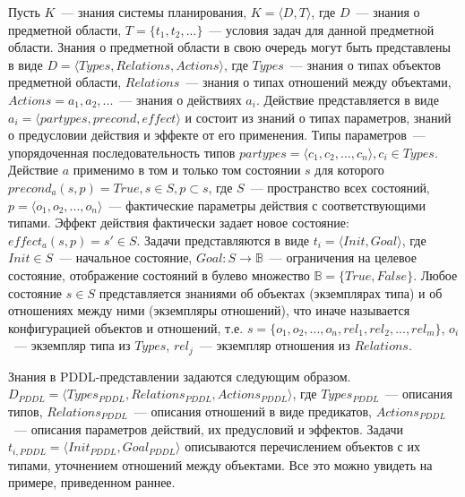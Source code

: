 \documentclass[a4paper,14pt]{extreport}
\begin{document}
   \par  Пусть $K$~--- знания системы планирования, $K = \langle D, T \rangle$, где $D$~--- знания о предметной области,
    $T = \{t_1, t_2, ...\}$~--- условия задач для данной предметной области.
 Знания о предметной области в свою очередь могут быть представлены в виде $D = \langle Types, Relations, Actions \rangle$, где $Types$~--- знания о типах объектов предметной области, $Relations$~--- знания о типах отношений между объектами, $Actions = {a_1, a_2, ...}$~--- знания о действиях $a_i$.
 Действие представляется в виде $a_i = \langle partypes, precond, effect \rangle$ и состоит из знаний о типах параметров, знаний о предусловии действия и эффекте от его применения.
 Типы параметров~--- упорядоченная последовательность типов $ partypes = \langle c_1, c_2, ..., c_n \rangle, c_i \in Types$.
 Действие $a$ применимо в том и только том состоянии $s$ для которого $precond_a(s,p) = True, s \in S, p \subset s$, где $S$~--- пространство всех состояний, $p = \langle o_1, o_2, ..., o_n \rangle$~--- фактические параметры действия с соответствующими типами.
 Эффект действия фактически задает новое состояние: $effect_a(s, p) = s' \in S$.
 Задачи представляются в виде $t_i = \langle Init, Goal \rangle$, где $Init \in S$~--- начальное состояние, $Goal: S \rightarrow \mathbb{B}$~--- ограничения на целевое состояние, отображение состояний в булево множество $\mathbb{B} = \{ True, False\}$.
 Любое состояние $s \in S$ представляется знаниями об объектах (экземплярах типа) и об отношениях между ними (экземпляры отношений), что иначе называется конфигурацией объектов и отношений, т.е.
 $s = \{o_1, o_2, ..., o_n, rel_1, rel_2, ..., rel_m\}$, $o_i$~--- экземпляр типа из $Types$, $rel_j$~--- экземпляр отношения из $Relations$.
    
    Знания в PDDL-представлении задаются следующим образом.
 $D_{PDDL} = \langle Types_{PDDL}, Relations_{PDDL}, Actions_{PDDL} \rangle$, где $Types_{PDDL}$~--- описания типов, $Relations_{PDDL}$~--- описания отношений в виде предикатов, $Actions_{PDDL}$~--- описания параметров действий, их предусловий и эффектов.
 Задачи  $t_{i, PDDL} = \langle Init_{PDDL}, Goal_{PDDL} \rangle$ описываются перечислением объектов с их типами, уточнением отношений между объектами.
   Все это можно увидеть на примере, приведенном раннее.
    
\end{document}

